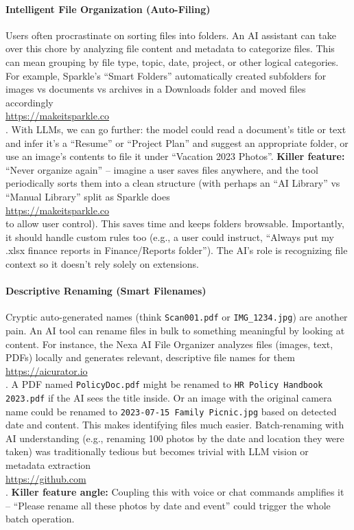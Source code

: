 \documentclass[11pt]{article}
\begin{document}
\paragraph{Intelligent File Organization (Auto-Filing)} Users often procrastinate on sorting files into folders. An AI assistant can take over this chore by analyzing file content and metadata to categorize files. This can mean grouping by file type, topic, date, project, or other logical categories. For example, Sparkle’s “Smart Folders” automatically created subfolders for images vs documents vs archives in a Downloads folder and moved files accordingly \\ \url{https://makeitsparkle.co} \\ . With LLMs, we can go further: the model could read a document’s title or text and infer it’s a “Resume” or “Project Plan” and suggest an appropriate folder, or use an image’s contents to file it under “Vacation 2023 Photos”. \textbf{Killer feature:} “Never organize again” -- imagine a user saves files anywhere, and the tool periodically sorts them into a clean structure (with perhaps an “AI Library” vs “Manual Library” split as Sparkle does \\ \url{https://makeitsparkle.co} \\ to allow user control). This saves time and keeps folders browsable. Importantly, it should handle custom rules too (e.g., a user could instruct, “Always put my .xlsx finance reports in Finance/Reports folder”). The AI’s role is recognizing file context so it doesn’t rely solely on extensions.

\paragraph{Descriptive Renaming (Smart Filenames)} Cryptic auto-generated names (think \texttt{Scan001.pdf} or \texttt{IMG\_1234.jpg}) are another pain. An AI tool can rename files in bulk to something meaningful by looking at content. For instance, the Nexa AI File Organizer analyzes files (images, text, PDFs) locally and generates relevant, descriptive file names for them \\ \url{https://aicurator.io} \\ . A PDF named \texttt{PolicyDoc.pdf} might be renamed to \texttt{HR Policy Handbook 2023.pdf} if the AI sees the title inside. Or an image with the original camera name could be renamed to \texttt{2023-07-15 Family Picnic.jpg} based on detected date and content. This makes identifying files much easier. Batch-renaming with AI understanding (e.g., renaming 100 photos by the date and location they were taken) was traditionally tedious but becomes trivial with LLM vision or metadata extraction \\ \url{https://github.com} \\ . \textbf{Killer feature angle:} Coupling this with voice or chat commands amplifies it -- “Please rename all these photos by date and event” could trigger the whole batch operation.
\end{document}
